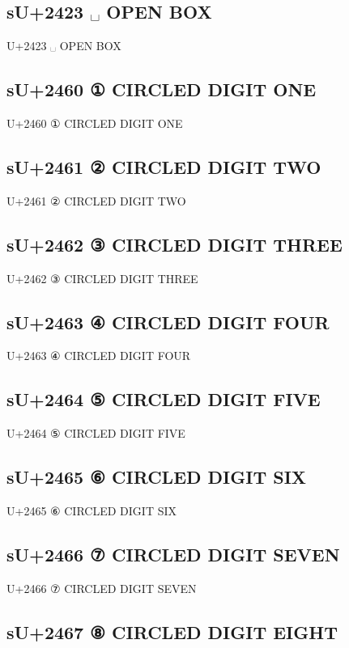 \subsection{sU+2423 ␣  OPEN BOX}

U+2423 ␣  OPEN BOX

\subsection{sU+2460 ① CIRCLED DIGIT ONE}

U+2460 ① CIRCLED DIGIT ONE

\subsection{sU+2461 ② CIRCLED DIGIT TWO}

U+2461 ② CIRCLED DIGIT TWO

\subsection{sU+2462 ③ CIRCLED DIGIT THREE}

U+2462 ③ CIRCLED DIGIT THREE

\subsection{sU+2463 ④ CIRCLED DIGIT FOUR}

U+2463 ④ CIRCLED DIGIT FOUR

\subsection{sU+2464 ⑤ CIRCLED DIGIT FIVE}

U+2464 ⑤ CIRCLED DIGIT FIVE

\subsection{sU+2465 ⑥ CIRCLED DIGIT SIX}

U+2465 ⑥ CIRCLED DIGIT SIX

\subsection{sU+2466 ⑦ CIRCLED DIGIT SEVEN}

U+2466 ⑦ CIRCLED DIGIT SEVEN

\subsection{sU+2467 ⑧ CIRCLED DIGIT EIGHT}

